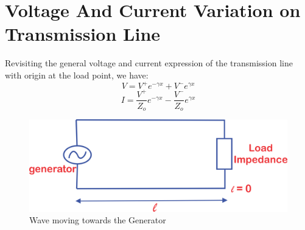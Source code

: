 \section{Voltage And Current Variation on Transmission Line}

Revisiting the general voltage and current expression of the transmission line with origin  at the load point, we have:
\begin{equation}
V =  V^+ e^{- \gamma x} + V^- e^{\gamma x}
\label{eqn:genvoltage}
\end{equation}
\begin{equation}
I= \frac{V^+}{Z_o} e^{- \gamma x} - \frac{V^-}{Z_o} e^{\gamma x}
\label{eqn:gencurrent}
\end{equation}
\begin{figure}[h]
\centering
\includegraphics[width=0.9\linewidth]{./graphics/11111111}
\caption{Wave moving towards the Generator}
\label{fig:11111111}
\end{figure}

